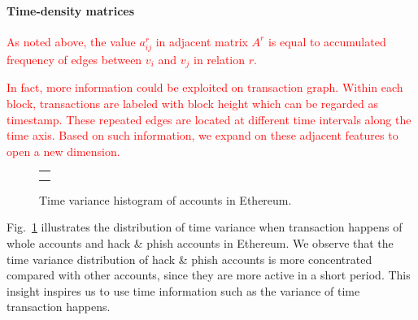 

\paragraph{Time-density matrices}
\textcolor{red}{As noted above, the value $a^r_{ij}$ in adjacent matrix $A^r$ is equal to accumulated frequency of edges between $v_i$ and $v_j$ in relation $r$. }


\textcolor{red}{In fact, more information could be exploited on transaction graph. Within each block, transactions are labeled with block height which can be regarded as timestamp. These repeated edges are located at different time intervals along the time axis. Based on such information, we expand on these adjacent features to open a new dimension.}


 
\begin{figure}[htbp]
\centering
\begin{tabular}{c}
	\subfigure[Time variance histogram of whole nodes.]{
		\label{fig:high_order}
    
	}\\
	\subfigure[Time variance histogram of hack\&phish nodes.]{
		\label{fig:asymmetric}
    
	}
\end{tabular}
\caption{Time variance histogram of accounts in Ethereum.}
\label{fig:time_std}
\end{figure}

Fig.~\ref{fig:time_std} illustrates the distribution of time variance when transaction happens of whole accounts and hack \& phish accounts in Ethereum. We observe that the time variance distribution of hack \& phish accounts is more concentrated compared with other accounts, since they are more active in a short period. This insight inspires us to use time information such as the variance of time transaction happens.

